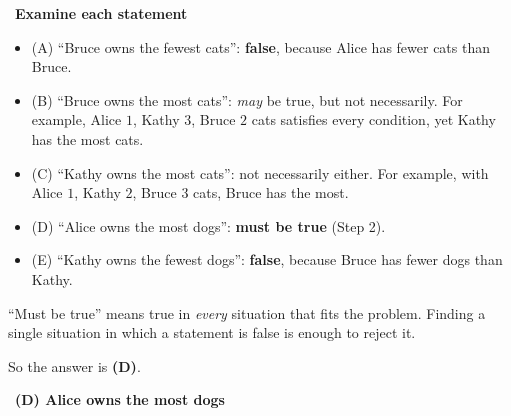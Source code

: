 \documentclass[11pt]{article}
\providecommand{\AnsWord}{Đáp số}
\newcommand{\ans}[1]{\par\smallskip{\bfseries\color{tmGreen!88!black}\AnsWord:}\ {\bfseries\color{AnsRed}#1}\par}
\newcommand{\step}[2]{\par\smallskip\noindent{\bfseries\color{tmBlue!85!black}\StepWord~#1.}\ {\bfseries #2}\par\nopagebreak}
\def\AnsWord{Answer}
\def\StepWord{Step}
\begin{document}
{\step{3}{Examine each statement}
\begin{itemize}[leftmargin=1.3em,itemsep=1pt]
\item (A) ``Bruce owns the fewest cats'': \textbf{false}, because Alice has fewer cats than Bruce.
\item (B) ``Bruce owns the most cats'': \emph{may} be true, but not necessarily. For example, Alice $1$, Kathy $3$, Bruce $2$ cats satisfies every condition, yet Kathy has the most cats.
\item (C) ``Kathy owns the most cats'': not necessarily either. For example, with Alice $1$, Kathy $2$, Bruce $3$ cats, Bruce has the most.
\item (D) ``Alice owns the most dogs'': \textbf{must be true} (Step 2).
\item (E) ``Kathy owns the fewest dogs'': \textbf{false}, because Bruce has fewer dogs than Kathy.
\end{itemize}
\begin{warnbox}``Must be true'' means true in \emph{every} situation that fits the problem. Finding a single situation in which a statement is false is enough to reject it.\end{warnbox}
So the answer is \textbf{(D)}.
\ans{(D) Alice owns the most dogs}
}
\end{document}
